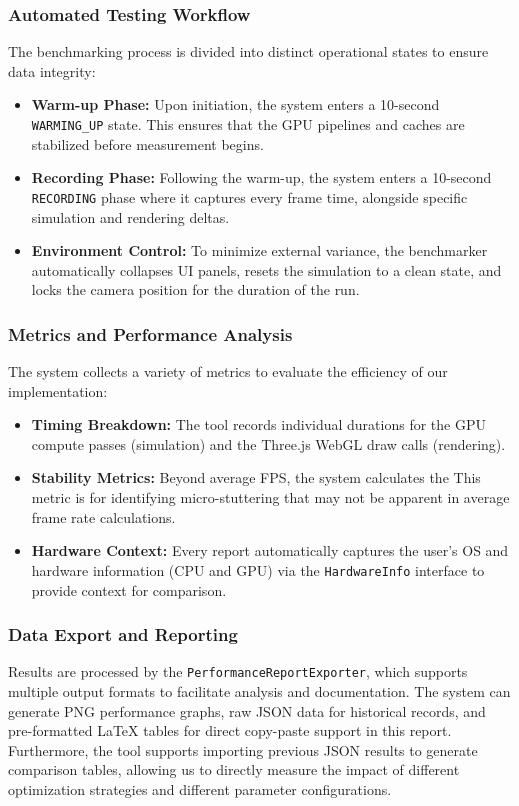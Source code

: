 \documentclass[a4paper, 12pt]{article}
\begin{document}
\subsubsection{Automated Testing Workflow}
The benchmarking process is divided into distinct operational states to ensure
data integrity:
\begin{itemize}
    \item \textbf{Warm-up Phase:} Upon initiation, the system enters a 10-second \texttt{WARMING\_UP} state. This ensures that the GPU pipelines and caches are stabilized before measurement begins.
    \item \textbf{Recording Phase:} Following the warm-up, the system enters a 10-second \texttt{RECORDING} phase where it captures every frame time, alongside specific simulation and rendering deltas.
    \item \textbf{Environment Control:} To minimize external variance, the benchmarker automatically collapses UI panels, resets the simulation to a clean state, and locks the camera position for the duration of the run.
\end{itemize}

\subsubsection{Metrics and Performance Analysis}
The system collects a variety of metrics to evaluate the efficiency of our
implementation:
\begin{itemize}
    \item \textbf{Timing Breakdown:} The tool records individual durations for the GPU compute passes (simulation) and the Three.js WebGL draw calls (rendering).
    \item \textbf{Stability Metrics:} Beyond average FPS, the system calculates the  This metric is for identifying micro-stuttering that may not be apparent in average frame rate calculations.
    \item \textbf{Hardware Context:} Every report automatically captures the user's OS and hardware information (CPU and GPU) via the \texttt{HardwareInfo} interface to provide context for comparison.
\end{itemize}

\subsubsection{Data Export and Reporting}
Results are processed by the \texttt{PerformanceReportExporter}, which supports
multiple output formats to facilitate analysis and documentation. The system
can generate PNG performance graphs, raw JSON data for historical records, and
pre-formatted LaTeX tables for direct copy-paste support in this report.
Furthermore, the tool supports importing previous JSON results to generate
comparison tables, allowing us to directly measure the impact of different
optimization strategies and different parameter configurations.
\end{document}
